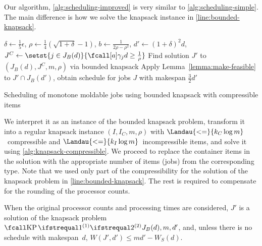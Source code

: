 Our algorithm, \cref{alg:scheduling-improved} is very similar to \cref{alg:scheduling-simple}.
The main difference is how we solve the knapsack instance in \cref{line:bounded-knapsack}.
\begin{algorithm}
  $\delta \leftarrow \frac{1}{5} \epsilon$, $\rho \leftarrow \frac{1}{4}(\sqrt{1+\delta} - 1)$,
    $b \leftarrow \frac{1}{2\rho - \rho^2}$, $d' \leftarrow (1+\delta)^2 d$,
    $J^C \leftarrow \setst{j \in J_B(d)}{\procnum{j}{d} \geq \frac{1}{\rho}}$ \;
  Find solution $J'$ to $(J_B(d), J^C, m, \rho)$ via bounded knapsack \label{line:bounded-knapsack}\;
  Apply Lemma~\ref{lemma:make-feasible} to $J' \cap J_B(d')$,
    obtain schedule for jobs $J$ with makespan $\frac{3}{2}d'$ \;
  
  \caption{Scheduling of monotone moldable jobs using bounded knapsack with compressible items}
  \label{alg:scheduling-improved}
\end{algorithm}
We interpret it as an instance of the bounded knapsack problem,
transform it into a regular knapsack instance $(I, I_C, m, \rho)$
with $\Landau{<=}{k_C \log m}$~compressible and $\Landau{<=}{k_I \log m}$~incompressible items,
and solve it using \cref{alg:knapsack-compressible}.
We proceed to replace the container items in the solution
with the appropriate number of items (jobs) from the corresponding type.
Note that we used only part of the compressibility
for the solution of the knapsack problem in \cref{line:bounded-knapsack}.
The rest is required to compensate for the rounding of the processor counts.

\begin{lemma}
  \label{lemma:unrounded-feasible}
  When the original processor counts and processing times are considered,
  $J'$ is a solution of the knapsack problem $\KP{J_B(d)}{m, d'}$,
  and, unless there is no schedule with makespan~$d$,
  $W(J', d') \leq md' - W_S(d)$.
\end{lemma}

